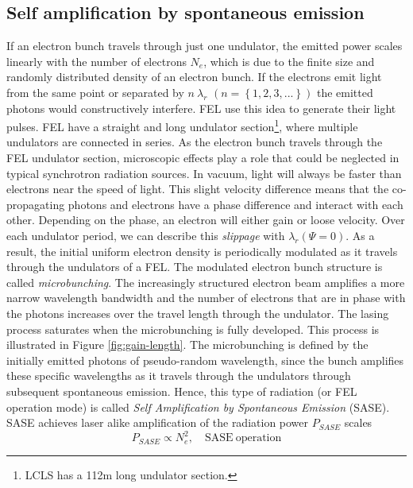 \subsection{Self amplification by spontaneous emission}\label{sec:sase}
If an electron bunch travels through just one undulator, the emitted power scales linearly with the number of electrons $N_{e}$, which is due to the finite size and randomly distributed density of an electron bunch. If the electrons emit light from the same point or separated by $n\ \lambda_{r}$ $\left(n=\left\{1,2,3,...\right\}\right)$ the emitted photons would constructively interfere. FEL use this idea to generate their light pulses. FEL have a straight and long undulator section\footnote{LCLS has a 112m long undulator section.}, where multiple undulators are connected in series. As the electron bunch travels through the FEL undulator section, microscopic effects play a role that could be neglected in typical synchrotron radiation sources. In vacuum, light will always be faster than electrons near the speed of light. This slight velocity difference means that the co-propagating photons and electrons have a phase difference and interact with each other. Depending on the phase, an electron will either gain or loose velocity. Over each undulator period, we can describe this \textit{slippage} with $\lambda_{r}(\Psi = 0)$. As a result, the initial uniform electron density is periodically modulated as it travels through the undulators of a FEL. The modulated electron bunch structure is called \textit{microbunching}. The increasingly structured electron beam amplifies a more narrow wavelength bandwidth and the number of electrons that are in phase with the photons increases over the travel length through the undulator. The lasing process saturates when the microbunching is fully developed. This process is illustrated in Figure \ref{fig:gain-length}.
The microbunching is defined by the initially emitted photons of pseudo-random wavelength, since the bunch amplifies these specific wavelengths as it travels through the undulators through subsequent spontaneous emission.
Hence, this type of radiation (or FEL operation mode) is called \textit{Self Amplification by Spontaneous Emission} (SASE). SASE achieves laser alike amplification of the radiation power $P_{SASE}$ scales \citep[see][p.~61]{Als-Nielson-2011-JWS}
\begin{equation}
P_{SASE} \propto N_{e}^{2},\quad \mathrm{SASE\ operation}
\end{equation}
